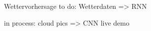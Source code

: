 \begin{frame}[t]{Wettervorhersage}
	to do:
	Wetterdaten => RNN

	in process:
	cloud pics => CNN
		live demo
\end{frame}
